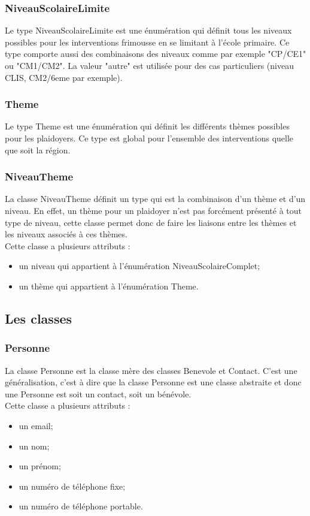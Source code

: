 \subsubsection*{NiveauScolaireLimite}

Le type NiveauScolaireLimite est une énumération qui définit tous les niveaux possibles pour les interventions frimousse en se limitant à l'école primaire. Ce type comporte aussi des combinaisons des niveaux comme par exemple "CP/CE1" ou "CM1/CM2". La valeur "autre" est utilisée pour des cas particuliers (niveau CLIS, CM2/6eme par exemple).

\subsubsection*{Theme}

Le type Theme est une énumération qui définit les différents thèmes possibles pour les plaidoyers. Ce type est global pour l'ensemble des interventions quelle que soit la région.  

\subsubsection*{NiveauTheme}

La classe NiveauTheme définit un type qui est la combinaison d'un thème et d'un niveau. En effet, un thème pour un plaidoyer n'est pas forcément présenté à tout type de niveau, cette classe permet donc de faire les liaisons entre les thèmes et les niveaux associés à ces thèmes.\\
Cette classe a plusieurs attributs : 
\begin{itemize}
\item un niveau qui appartient à l'énumération NiveauScolaireComplet;
\item un thème qui appartient à l'énumération Theme.
\end{itemize}


\subsection{Les classes}

\subsubsection*{Personne}

La classe Personne est la classe mère des classes Benevole et Contact. C'est une généralisation, c'est à dire que la classe Personne est une classe abstraite et donc une Personne est soit un contact, soit un bénévole. \\
Cette classe a plusieurs attributs : 
\begin{itemize}
\item un email;
\item un nom;
\item un prénom;
\item un numéro de téléphone fixe;
\item un numéro de téléphone portable.
\end{itemize}

